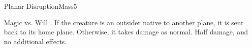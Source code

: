 \begin{spellsection}{Planar Disruption}{Mass}{5}
\begin{spellheader}
\end{spellheader}
\begin{spellcontent}
    \begin{spelltargetinginfo}
    \end{spelltargetinginfo}
    \begin{spelleffects}
        \begin{spellattack}{Magic vs. Will}
            \spellsuccess {}.
            \spellcritical If the creature is an outsider native to another plane, it is sent back to its home plane. Otherwise, it takes damage as normal.
            \spellfailure Half damage, and no additional effects.
        \end{spellattack}
    \end{spelleffects}
\end{spellcontent}
\begin{spellfooter}
\end{spellfooter}
\end{spellsection}

